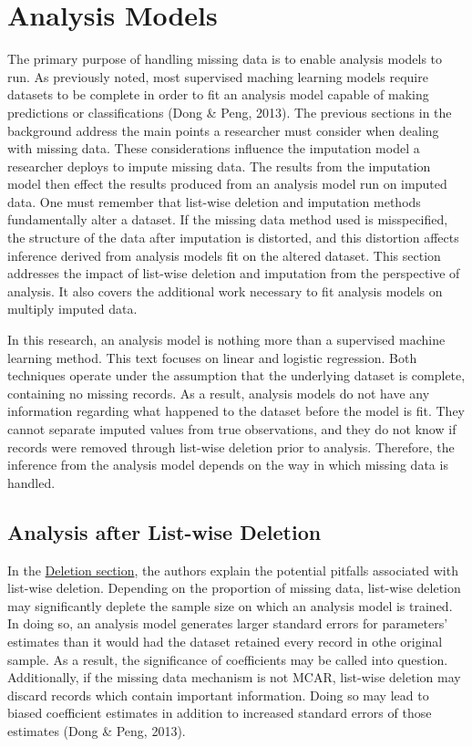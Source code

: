 \documentclass[12pt,oneside]{chicagocapstone}
\begin{document}
\section*{Analysis Models}\label{background-analysis}

The primary purpose of handling missing data is to enable analysis
models to run. As previously noted, most supervised maching learning
models require datasets to be complete in order to fit an analysis model
capable of making predictions or classifications (Dong \& Peng, 2013).
The previous sections in the background address the main points a
researcher must consider when dealing with missing data. These
considerations influence the imputation model a researcher deploys to
impute missing data. The results from the imputation model then effect
the results produced from an analysis model run on imputed data. One
must remember that list-wise deletion and imputation methods
fundamentally alter a dataset. If the missing data method used is
misspecified, the structure of the data after imputation is distorted,
and this distortion affects inference derived from analysis models fit
on the altered dataset. This section addresses the impact of list-wise
deletion and imputation from the perspective of analysis. It also covers
the additional work necessary to fit analysis models on multiply imputed
data.

In this research, an analysis model is nothing more than a supervised
machine learning method. This text focuses on linear and logistic
regression. Both techniques operate under the assumption that the
underlying dataset is complete, containing no missing records. As a
result, analysis models do not have any information regarding what
happened to the dataset before the model is fit. They cannot separate
imputed values from true observations, and they do not know if records
were removed through list-wise deletion prior to analysis. Therefore,
the inference from the analysis model depends on the way in which
missing data is handled.

\subsection*{Analysis after List-wise
Deletion}\label{background-analysis-listwise}

In the \protect\hyperlink{background-deletion}{Deletion section}, the
authors explain the potential pitfalls associated with list-wise
deletion. Depending on the proportion of missing data, list-wise
deletion may significantly deplete the sample size on which an analysis
model is trained. In doing so, an analysis model generates larger
standard errors for parameters' estimates than it would had the dataset
retained every record in othe original sample. As a result, the
significance of coefficients may be called into question. Additionally,
if the missing data mechanism is not MCAR, list-wise deletion may
discard records which contain important information. Doing so may lead
to biased coefficient estimates in addition to increased standard errors
of those estimates (Dong \& Peng, 2013).
\end{document}
